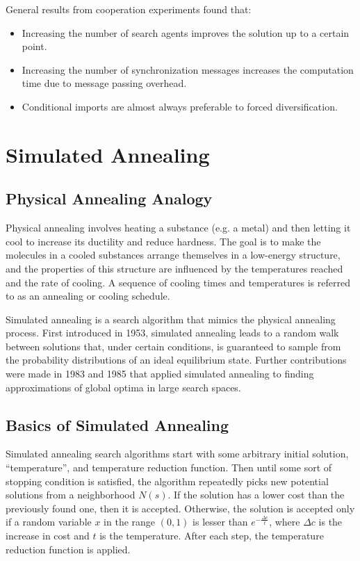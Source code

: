 \documentclass[12pt,titlepage]{article}
\let\stdsection\section
\renewcommand\section{\clearpage\stdsection}
\begin{document}
      General results from cooperation experiments found that:
      \begin{itemize}
        \item Increasing the number of search agents improves the solution up to a certain point.
        \item Increasing the number of synchronization messages increases the computation time due to message passing overhead.
        \item Conditional imports are almost always preferable to forced diversification.
      \end{itemize}

  \section{Simulated Annealing}

    \subsection{Physical Annealing Analogy}
      Physical annealing involves heating a substance (e.g. a metal) and then letting it cool to increase its ductility and reduce hardness. The goal is to make the molecules
      in a cooled substances arrange themselves in a low-energy structure, and the properties of this structure are influenced by the temperatures reached and the rate of cooling.
      A sequence of cooling times and temperatures is referred to as an annealing or cooling schedule.

      Simulated annealing is a search algorithm that mimics the physical annealing process. First introduced in 1953, simulated annealing leads to a random walk between
      solutions that, under certain conditions, is guaranteed to sample from the probability distributions of an ideal equilibrium state. Further contributions were made in 1983
      and 1985 that applied simulated annealing to finding approximations of global optima in large search spaces.

    \subsection{Basics of Simulated Annealing}
      Simulated annealing search algorithms start with some arbitrary initial solution, ``temperature'', and temperature reduction function. Then until some sort of stopping condition
      is satisfied, the algorithm repeatedly picks new potential solutions from a neighborhood $N(s)$. If the solution has a lower cost than the previously found one, then it is accepted.
      Otherwise, the solution is accepted only if a random variable $x$ in the range $(0, 1)$ is lesser than $e^{- \frac{\Delta c}{t}}$, where $\Delta c$ is the increase in cost and $t$ is
      the temperature. After each step, the temperature reduction function is applied.
\end{document}
